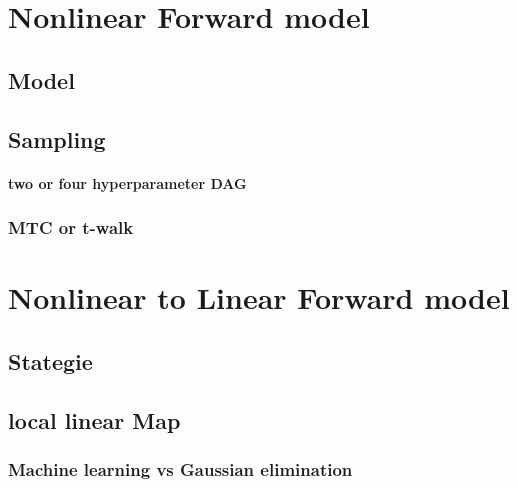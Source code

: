 \chapter{Nonlinear Forward model}

\section{Model}

\section{Sampling}

\subsubsection{two or four hyperparameter DAG}
\subsection{MTC or t-walk}

\chapter{Nonlinear to Linear Forward model}
\section{Stategie}
\section{local linear Map}
\subsection{Machine learning vs Gaussian elimination}